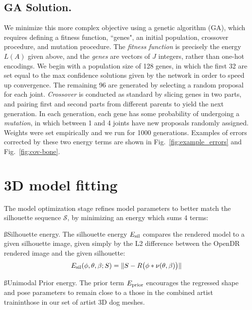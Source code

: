 \subsection{GA Solution.}
We minimize this more complex objective using a genetic algorithm (GA)\cite{holland1992adaptation}, which requires defining a fitness function, ``genes", an initial population, crossover procedure, and mutation procedure. 
The {\em fitness function} is precisely the energy $L(A)$ given above, and the {\em genes} are vectors of $J$ integers, rather than one-hot encodings.
We begin with a population size of 128 genes, in which the first 32 are set equal to the max confidence solutions given by the network in order to speed up convergence. The remaining 96 are generated by selecting a random proposal for each joint. {\em Crossover} is conducted as standard by slicing genes in two parts, and pairing first and second parts from different parents to yield the next generation. In each generation, each gene has some probability of undergoing a {\em mutation}, in which between 1 and 4 joints have new proposals randomly assigned. Weights were set empirically and we run for 1000 generations.
Examples of errors corrected by these two energy terms are shown in Fig.~\ref{fig:example_errors} and Fig.~\ref{fig:cov-bone}.

\section{3D model fitting}
The model optimization stage refines model parameters to better match the silhouette sequence $\mathcal S$, by minimizing an energy which sums 4 terms:

\ss{Silhouette energy.}
The silhouette energy $E_\textrm{sil}$ compares the rendered model to a given silhouette image, given simply by the L2 difference between the OpenDR rendered image and the given silhouette:
\begin{equation}
E_\textrm{sil}(\phi, \theta, \beta; S) = \lVert S - R\bigl(\phi * \nu(\theta, \beta)\bigr) \rVert
\end{equation}

\ss{Unimodal Prior energy.}
The prior term $E_\textrm{prior}$ encourages the regressed shape and pose parameters to remain close to a those in the combined artist traininthose in our set of artist 3D dog meshes.


